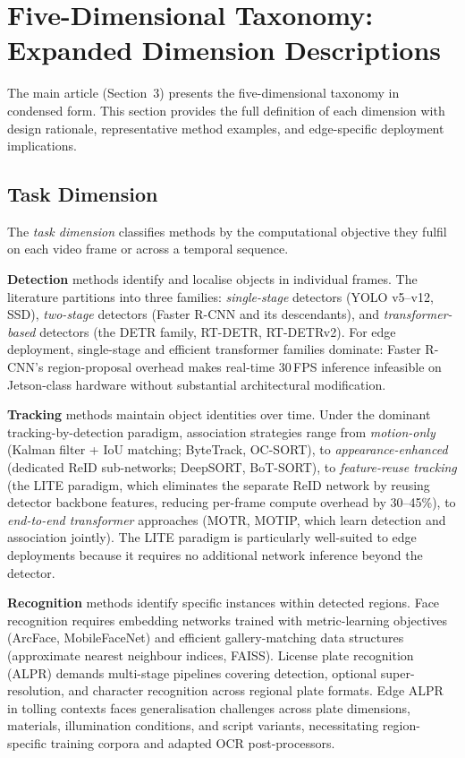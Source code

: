 \documentclass[11pt,a4paper]{article}
\begin{document}
\section{Five-Dimensional Taxonomy: Expanded Dimension Descriptions}
\label{sec:taxonomy_expanded}

\noindent The main article (Section~3) presents the five-dimensional
taxonomy in condensed form. This section provides the full definition
of each dimension with design rationale, representative method
examples, and edge-specific deployment implications.

\subsection{Task Dimension}
\label{subsec:tax_task}

The \textit{task dimension} classifies methods by the computational
objective they fulfil on each video frame or across a temporal sequence.

\medskip
\noindent\textbf{Detection} methods identify and localise objects in
individual frames. The literature partitions into three families:
\textit{single-stage} detectors (YOLO v5--v12, SSD),
\textit{two-stage} detectors (Faster R-CNN and its descendants), and
\textit{transformer-based} detectors (the DETR family,
RT-DETR, RT-DETRv2). For edge deployment, single-stage and efficient
transformer families dominate: Faster R-CNN's region-proposal
overhead makes real-time 30\,FPS inference infeasible on Jetson-class
hardware without substantial architectural modification.

\medskip
\noindent\textbf{Tracking} methods maintain object identities over
time. Under the dominant tracking-by-detection paradigm, association
strategies range from \textit{motion-only} (Kalman filter + IoU
matching; ByteTrack, OC-SORT), to \textit{appearance-enhanced}
(dedicated ReID sub-networks; DeepSORT, BoT-SORT), to
\textit{feature-reuse tracking} (the LITE paradigm, which eliminates
the separate ReID network by reusing detector backbone features,
reducing per-frame compute overhead by 30--45\%), to
\textit{end-to-end transformer} approaches (MOTR, MOTIP, which
learn detection and association jointly). The LITE paradigm is
particularly well-suited to edge deployments because it requires
no additional network inference beyond the detector.

\medskip
\noindent\textbf{Recognition} methods identify specific instances
within detected regions. Face recognition requires embedding networks
trained with metric-learning objectives (ArcFace, MobileFaceNet) and
efficient gallery-matching data structures (approximate nearest
neighbour indices, FAISS). License plate recognition (ALPR) demands
multi-stage pipelines covering detection, optional super-resolution,
and character recognition across regional plate formats. Edge ALPR
in tolling contexts faces generalisation challenges across plate
dimensions, materials, illumination conditions, and script variants,
necessitating region-specific training corpora and adapted OCR
post-processors.
\end{document}
